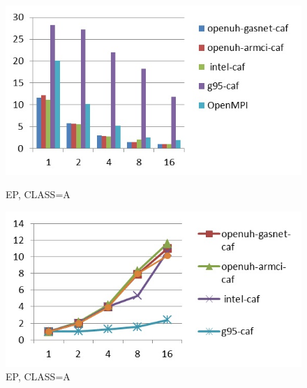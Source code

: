 \begin{figure}[ht]
\begin{minipage}[b]{0.45\linewidth}
\centering
\includegraphics[width=\textwidth]{./figures/ep_A_time.jpg}
\caption{EP, CLASS=A}
\label{fig:figure1}
\end{minipage}
\hspace{0.5cm}
\begin{minipage}[b]{0.45\linewidth}
\centering
\includegraphics[width=\textwidth]{./figures/ep_A_scalability.jpg}
\caption{EP, CLASS=A}
\label{fig:figure2}
\end{minipage}
\end{figure}



